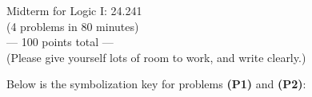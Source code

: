 \documentclass[12pt]{article}
\begin{document}

%
\newcommand{\detritus}[1]{}


\thispagestyle{empty}



\iffalse
\parindent = 0pt
\hspace*{0.0in}\parbox[t]{2.5in}{
Philosophy 24.241\\[3pt]
Symbolic Logic\\[3pt]
Fall, 2022
}
\fi 


\iffalse 
\begin{center}
\Large\bf Problem Set 5\\[1ex] 
 Due Fri. {\bf{October 14th}} by 5pm Eastern\\[3ex]
\end{center}
\fi

\begin{center}
\large Midterm for Logic I: 24.241 \\[1ex] 
\normalsize (4 problems in 80 minutes)\\
  \vspace{.1in}
\normalsize --- 100 points total ---\\
  \vspace{.25in}
\normalsize (Please give yourself lots of room to work, and write clearly.)
  \vspace{.5in}
\end{center}



\noindent
Below is the symbolization key for problems \textbf{(P1)} and \textbf{(P2)}: 
\end{document}
